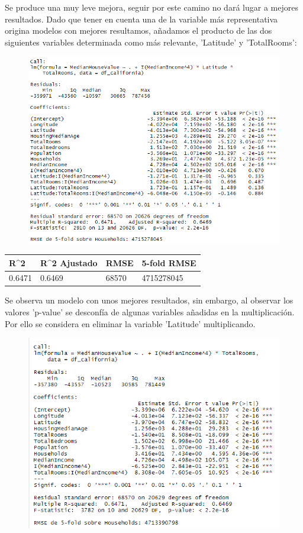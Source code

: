 Se produce una muy leve mejora, seguir por este camino no dará lugar a mejores resultados. 
Dado que tener en cuenta una de la variable más representativa origina modelos con mejores resultamos, añadamos el producto de las dos siguientes variables determinada como más relevante, 'Latitude' y 'TotalRooms':
\begin{figure}[!h]
	\centering
	\includegraphics[width=0.7\linewidth]{figures/fit_multi_7}
	\caption{}
	\label{fig:fitmulti7}
\end{figure}

\begin{table}[!h]
	\centering
	\begin{tabular}{llll}
		R\textasciicircum{}2 & R\textasciicircum{}2 Ajustado & RMSE  & 5-fold RMSE \\ \hline
		0.6471               & 0.6469                        & 68570 & 4715278045 
	\end{tabular}
\end{table}

Se observa un modelo con unos mejores resultados, sin embargo, al observar los valores 'p-value' se desconfía de algunas variables añadidas en la multiplicación. \\

Por ello se considera en eliminar la variable 'Latitude' multiplicando.
\newpage
\begin{figure}[!h]
	\centering
	\includegraphics[width=0.7\linewidth]{figures/fit_multi_8}
	\caption{}
	\label{fig:fitmulti8}
\end{figure}

